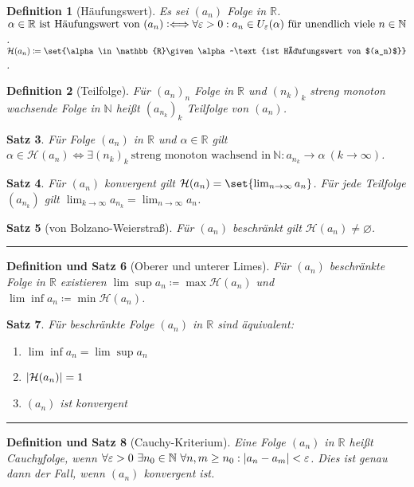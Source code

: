 \documentclass[a4paper]{article}
\newcounter{Sec}
\theoremstyle{marginbreak}
\newtheorem{definition}{Definition}[Sec]
\newtheorem{satz}[definition]{Satz}
\newtheorem{defsatz}[definition]{Definition und Satz}
\newcommand{\sep}{%
	\rule{\textwidth}{0.3pt}%
	\stepcounter{Sec}%
	}
\newcommand{\defiff}{\mathrel{\vcentcolon\Longleftrightarrow}}
\begin{document}
	\begin{definition}[Häufungswert]
		Es sei $(a_n)$ Folge in $\mathbb{R}$. $\alpha\in\mathbb{R}~\text{ist Häufungswert von $(a_n)$}\defiff\forall\varepsilon>0:a_n\in
		U_\varepsilon(\alpha)~\text{für unendlich viele}~n\in\mathbb{N}$. $\mathcal{H}(a_n)\coloneqq\set{\alpha\in\mathbb{R}\given
		\alpha~\text{ist Häufungswert von $(a_n)$}}$.
	\end{definition}
	\begin{definition}[Teilfolge]
		Für $(a_n)_n$ Folge in $\mathbb{R}$ und $(n_k)_k$ streng monoton wachsende
		Folge in $\mathbb{N}$ heißt $(a_{n_k})_k$ Teilfolge von $(a_n)$.
	\end{definition}
	\begin{satz}
		Für Folge $(a_n)$ in $\mathbb{R}$ und $\alpha\in\mathbb{R}$ gilt
		$\alpha\in\mathcal{H}(a_n)\iff\exists (n_k)_k~\text{streng monoton wachsend in}~\mathbb{N}:a_{n_k}\to\alpha~(k\to\infty)$.
	\end{satz}
	\begin{satz}
		Für $(a_n)$ konvergent gilt $\mathcal{H}(a_n)=\set{\lim_{n\to\infty} a_n}$. Für jede Teilfolge $(a_{n_k})$ gilt
		$\lim_{k\to\infty} a_{n_k} = \lim_{n\to\infty} a_n$.
	\end{satz}
	\begin{satz}[von Bolzano-Weierstraß]
		Für $(a_n)$ beschränkt gilt $\mathcal{H}(a_n)\neq\varnothing$.
	\end{satz}
	\sep
	\begin{defsatz}[Oberer und unterer Limes]
		Für $(a_n)$ beschränkte Folge in $\mathbb{R}$ existieren $\lim\sup a_n\coloneqq\max\mathcal{H}(a_n)$
		und $\lim\inf a_n\coloneqq\min\mathcal{H}(a_n)$.
	\end{defsatz}
	\begin{satz}
		Für beschränkte Folge $(a_n)$ in $\mathbb{R}$ sind äquivalent:
		\begin{enumerate}[label=(\alph*)]
			\item $\lim\inf a_n=\lim\sup a_n$
			\item $\abs{\mathcal{H}(a_n)} = 1$
			\item $(a_n)$ ist konvergent
		\end{enumerate}
	\end{satz}
	\sep
	\begin{defsatz}[Cauchy-Kriterium]
		Eine Folge $(a_n)$ in $\mathbb{R}$ heißt Cauchyfolge, wenn
		$\forall\varepsilon>0~\exists n_0\in\mathbb{N}~\forall n,m\geq n_0:\abs{a_n-a_m}<\varepsilon$.
		Dies ist genau dann der Fall, wenn $(a_n)$ konvergent ist.
	\end{defsatz}
\end{document}
